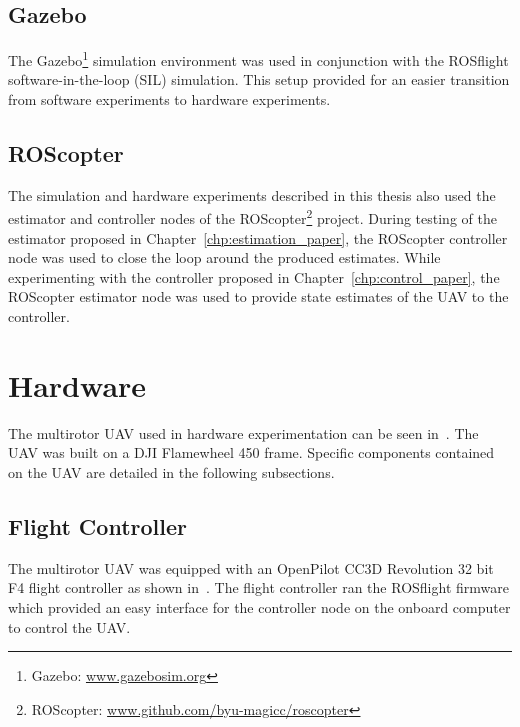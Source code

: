 \subsection {Gazebo}
The Gazebo\footnote{Gazebo:
\href{www.gazebosim.org}{www.gazebosim.org}} simulation environment was used
in conjunction
with the ROSflight software-in-the-loop
(SIL) simulation.
This setup provided for an easier transition from software
experiments to
hardware experiments.


\subsection {ROScopter}
The simulation and hardware experiments described in this thesis also used
the estimator and controller nodes of the ROScopter\footnote{ROScopter:
\href{www.github.com/byu-magicc/roscopter}{www.github.com/byu-magicc/roscopter}}
project.
During testing of the estimator proposed in
Chapter~\ref{chp:estimation_paper}, the ROScopter controller node was used to
close the loop around the produced estimates.
While experimenting with the
controller proposed in Chapter~\ref{chp:control_paper}, the ROScopter estimator node
was used to provide state estimates of the UAV to the controller.

\section{Hardware}
The multirotor UAV used in hardware experimentation can be seen
in~. The UAV was built on a DJI Flamewheel 450 frame.
Specific components contained on the UAV are detailed in the following
subsections.

\subsection{Flight Controller}
The multirotor UAV was equipped with an OpenPilot CC3D Revolution 32 bit F4
flight controller as shown in~. The flight controller ran the
ROSflight firmware which provided an easy interface
for the controller node on the onboard computer to control the UAV.

